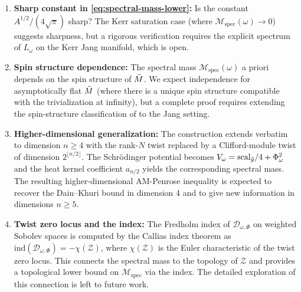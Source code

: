 \begin{remark}
\begin{enumerate}
\item \textbf{Sharp constant in \eqref{eq:spectral-mass-lower}:} Is the constant $A^{1/2}/(4\sqrt{\pi})$ sharp? The Kerr saturation case (where $\mathcal{M}_{\mathrm{spec}}(\omega) \to 0$) suggests sharpness, but a rigorous verification requires the explicit spectrum of $L_\omega$ on the Kerr Jang manifold, which is open.
\item \textbf{Spin structure dependence:} The spectral mass $\mathcal{M}_{\mathrm{spec}}(\omega)$ a priori depends on the spin structure of $\tilde{M}$. We expect independence for asymptotically flat $\tilde{M}$ (where there is a unique spin structure compatible with the trivialization at infinity), but a complete proof requires extending the spin-structure classification of \cite{lawson1989} to the Jang setting.
\item \textbf{Higher-dimensional generalization:} The construction extends verbatim to dimension $n\geq 4$ with the rank-$N$ twist replaced by a Clifford-module twist of dimension $2^{\lfloor n/2\rfloor}$. The Schr\"odinger potential becomes $V_\omega = \mathrm{scal}_{\tilde{g}}/4 + \Phi_\omega^2$ and the heat kernel coefficient $a_{n/2}$ yields the corresponding spectral mass. The resulting higher-dimensional AM-Penrose inequality is expected to recover the Dain--Khuri bound in dimension 4 and to give new information in dimensions $n\geq 5$.
\item \textbf{Twist zero locus and the index:} The Fredholm index of $\mathcal{D}_{\omega,\Phi}$ on weighted Sobolev spaces is computed by the Callias index theorem as $\mathrm{ind}(\mathcal{D}_{\omega,\Phi}) = -\chi(\mathcal{Z})$, where $\chi(\mathcal{Z})$ is the Euler characteristic of the twist zero locus. This connects the spectral mass to the topology of $\mathcal{Z}$ and provides a topological lower bound on $\mathcal{M}_{\mathrm{spec}}$ via the index. The detailed exploration of this connection is left to future work.
\end{enumerate}
\end{remark}

